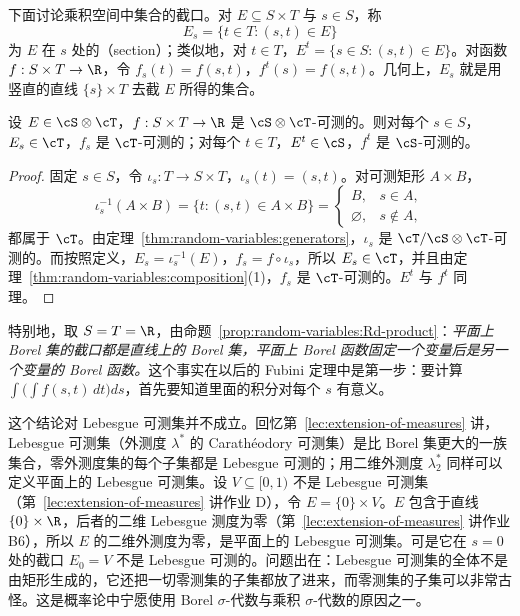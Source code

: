 下面讨论乘积空间中集合的截口。对 $E\subseteq S\times T$ 与 $s\in S$，称
\[
E_s=\{t\in T:(s,t)\in E\}
\]
为 $E$ 在 $s$ 处的（section）；类似地，对 $t\in T$，$E^t=\{s\in S:(s,t)\in E\}$。对函数 $f:S\times T\to\R$，令 $f_s(t)=f(s,t)$，$f^t(s)=f(s,t)$。几何上，$E_s$ 就是用竖直的直线 $\{s\}\times T$ 去截 $E$ 所得的集合。

\begin{theorem}[截口的可测性]\label{thm:random-variables:sections}
设 $E\in\cS\otimes\cT$，$f:S\times T\to\R$ 是 $\cS\otimes\cT$-可测的。则对每个 $s\in S$，$E_s\in\cT$，$f_s$ 是 $\cT$-可测的；对每个 $t\in T$，$E^t\in\cS$，$f^t$ 是 $\cS$-可测的。
\end{theorem}
\begin{proof}
固定 $s\in S$，令 $\iota_s:T\to S\times T$，$\iota_s(t)=(s,t)$。对可测矩形 $A\times B$，
\[
\iota_s^{-1}(A\times B)=\{t:(s,t)\in A\times B\}=\begin{cases}B,&s\in A,\\ \varnothing,&s\notin A,\end{cases}
\]
都属于 $\cT$。由定理~\ref{thm:random-variables:generators}，$\iota_s$ 是 $\cT/\cS\otimes\cT$-可测的。而按照定义，$E_s=\iota_s^{-1}(E)$，$f_s=f\circ\iota_s$，所以 $E_s\in\cT$，并且由定理~\ref{thm:random-variables:composition}(1)，$f_s$ 是 $\cT$-可测的。$E^t$ 与 $f^t$ 同理。
\end{proof}

特别地，取 $S=T=\R$，由命题~\ref{prop:random-variables:Rd-product}：\emph{平面上 Borel 集的截口都是直线上的 Borel 集，平面上 Borel 函数固定一个变量后是另一个变量的 Borel 函数。}这个事实在以后的 Fubini 定理中是第一步：要计算 $\int\bigl(\int f(s,t)\,dt\bigr)ds$，首先要知道里面的积分对每个 $s$ 有意义。

\begin{remark}
这个结论对 Lebesgue 可测集并不成立。回忆第~\ref{lec:extension-of-measures} 讲，Lebesgue 可测集（外测度 $\lambda^*$ 的 Carathéodory 可测集）是比 Borel 集更大的一族集合，零外测度集的每个子集都是 Lebesgue 可测的；用二维外测度 $\lambda_2^*$ 同样可以定义平面上的 Lebesgue 可测集。设 $V\subseteq[0,1)$ 不是 Lebesgue 可测集（第~\ref{lec:extension-of-measures} 讲作业 D），令 $E=\{0\}\times V$。$E$ 包含于直线 $\{0\}\times\R$，后者的二维 Lebesgue 测度为零（第~\ref{lec:extension-of-measures} 讲作业 B6），所以 $E$ 的二维外测度为零，是平面上的 Lebesgue 可测集。可是它在 $s=0$ 处的截口 $E_0=V$ 不是 Lebesgue 可测的。问题出在：Lebesgue 可测集的全体不是由矩形生成的，它还把一切零测集的子集都放了进来，而零测集的子集可以非常古怪。这是概率论中宁愿使用 Borel $\sigma$-代数与乘积 $\sigma$-代数的原因之一。
\end{remark}

